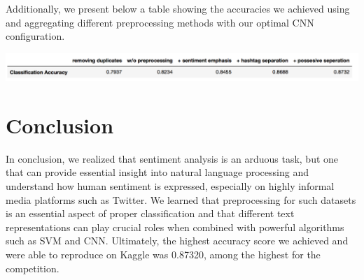 \documentclass[10pt,conference]{IEEEtran}
\begin{document}
Additionally, we present below a table showing the accuracies we achieved using and aggregating different preprocessing methods  with our optimal CNN configuration.

\bigskip
\includegraphics[scale=0.30]{classification_accuracies}
\medskip

\section*{Conclusion}
In conclusion, we realized that sentiment analysis is an arduous task, but one that can provide essential insight into natural language processing and understand how human sentiment is expressed, especially on highly informal media platforms such as Twitter. We learned that preprocessing for such datasets is an essential aspect of proper classification and that different text representations can play crucial roles when combined with powerful algorithms such as SVM and CNN. Ultimately, the highest accuracy score we achieved and were able to reproduce on Kaggle was 0.87320, among the highest for the competition. 



\end{document}
